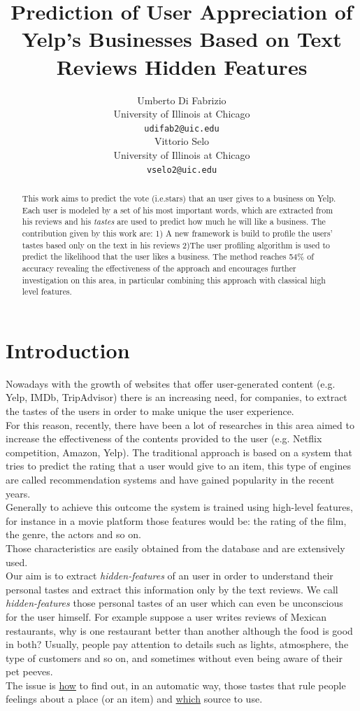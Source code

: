 \documentclass[11pt]{article}
\title{Prediction of User Appreciation of Yelp's Businesses Based on Text Reviews Hidden Features}
\author{Umberto Di Fabrizio \\
	University of Illinois at Chicago\\
	{\tt udifab2@uic.edu} \\\And
	Vittorio Selo \\
	University of Illinois at Chicago\\
	{\tt vselo2@uic.edu} \\}
\date{}
\begin{document}
\maketitle
\begin{abstract}
	This work aims to predict the vote (i.e.stars) that an user gives to a business on Yelp. Each user is modeled by a set of his most important words, which are extracted from his reviews and his \textit{tastes} are used to predict how much he will like a business. The contribution given by this work are: 1) A new framework is build to profile the users' tastes based only on the text in his reviews 2)The user profiling algorithm is used to predict the likelihood that the user likes a business. The method reaches 54\% of accuracy revealing the effectiveness of the approach and encourages further investigation on this area, in particular combining this approach with classical high level features.
\end{abstract}

\section{Introduction}

Nowadays with the growth of websites that offer user-generated content (e.g. Yelp, IMDb, TripAdvisor) there is an increasing need, for companies, to extract the tastes of the users in order to make unique the user experience.\\
For this reason, recently, there have been a lot of researches in this area aimed to increase the effectiveness of the contents provided to the user (e.g. Netflix competition\cite{Netflix}, Amazon, Yelp\cite{Nikulin}).
The traditional approach is based on a system that tries to predict the rating that a user would give to an item, this type of engines are called recommendation systems and have gained popularity in the recent years.\\
Generally to achieve this outcome the system is trained using high-level features, for instance in a movie platform those features would be: the rating of the film, the genre, the actors and so on.\\
Those characteristics are easily obtained from the database and are extensively used.\\
Our aim is to extract \textit{hidden-features} of an user in order to understand their personal tastes and extract this information only by the text reviews.
We call \textit{hidden-features} those personal tastes of an user which can even be unconscious for the user himself. 
For example suppose a user writes reviews of Mexican restaurants, why is one restaurant better than another although the food is good in both? Usually, people pay attention to details such as lights, atmosphere, the type of customers and so on, and sometimes without even being aware of their pet peeves.\\
The issue is \underline{how} to find out, in an automatic way, those tastes that rule people feelings about a place (or an item) and \underline{which} source to use.\\
\end{document}
